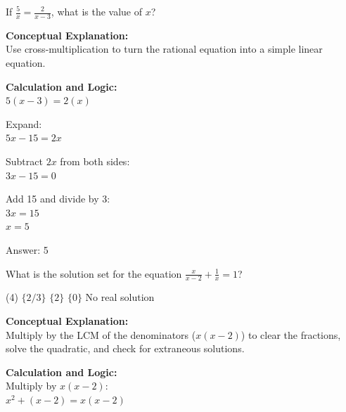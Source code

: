 \documentclass[11pt,paper=a4,answers]{exam}
\begin{document}
\begin{questions}
\vspace{40pt}

\question
If $\frac{5}{x} = \frac{2}{x-3}$, what is the value of $x$?

\begin{solution}
\textbf{Conceptual Explanation:} \\
Use cross-multiplication to turn the rational equation into a simple linear equation.

\vspace{20pt}

\textbf{Calculation and Logic:} \\
$5(x - 3) = 2(x)$

\vspace{10pt}

Expand: \\
$5x - 15 = 2x$

\vspace{10pt}

Subtract $2x$ from both sides: \\
$3x - 15 = 0$

\vspace{10pt}

Add 15 and divide by 3: \\
$3x = 15$ \\
$x = 5$

\vspace{25pt}

Answer: \colorbox{yellow!100}{5}
\end{solution}

\vspace{40pt}

\question
What is the solution set for the equation $\frac{x}{x-2} + \frac{1}{x} = 1$?
\begin{tasks}(4)
    \task $\{2/3\}$
    \task $\{2\}$
    \task $\{0\}$
    \task No real solution
\end{tasks}

\begin{solution}
\textbf{Conceptual Explanation:} \\
Multiply by the LCM of the denominators ($x(x-2)$) to clear the fractions, solve the quadratic, and check for extraneous solutions.

\vspace{20pt}

\textbf{Calculation and Logic:} \\
Multiply by $x(x-2)$: \\
$x^2 + (x-2) = x(x-2)$


\end{solution}
\end{questions}
\end{document}
